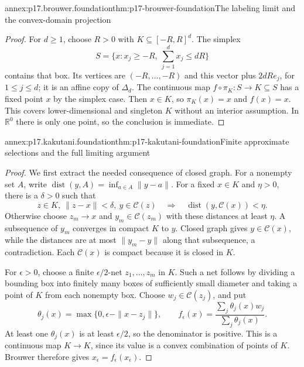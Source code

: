 \begin{annexitem}{annex:p17.brouwer.foundation}{thm:p17-brouwer-foundation}{The labeling limit and the convex-domain projection}
\begin{proof}
For \(d\geq1\), choose \(R>0\) with
\(K\subseteq[-R,R]^d\). The simplex
\[
          S=\{x:x_j\geq-R,\ \sum_{j=1}^d x_j\leq dR\}
\]
contains that box. Its vertices are
\((-R,\ldots,-R)\) and this vector plus
\(2dR e_j\), for \(1\leq j\leq d\);
it is an affine copy of \(\Delta_d\).
The continuous map \(f\circ\pi_K:S\to K\subseteq S\)
has a fixed point \(x\) by the simplex case.
Then \(x\in K\), so \(\pi_K(x)=x\) and
\(f(x)=x\). This covers lower-dimensional
and singleton \(K\) without an interior
assumption. In \(\mathbb R^0\) there is
only one point, so the conclusion is immediate.
\end{proof}
\end{annexitem}

\begin{annexitem}{annex:p17.kakutani.foundation}{thm:p17-kakutani-foundation}{Finite approximate selections and the full limiting argument}
\begin{proof}
We first extract the needed consequence of closed graph.
For a nonempty set \(A\), write
\(\operatorname{dist}(y,A)=\inf_{a\in A}\|y-a\|\).
For a fixed \(x\in K\) and \(\eta>0\), there is a
\(\delta>0\) such that
\[
 z\in K,\ \|z-x\|<\delta,\ y\in\mathcal C(z)
                    \quad\Longrightarrow\quad
                    \operatorname{dist}(y,\mathcal C(x))<\eta.
\]
Otherwise choose \(z_m\to x\) and
\(y_m\in\mathcal C(z_m)\) with these distances
at least \(\eta\). A subsequence of \(y_m\)
converges in compact \(K\) to \(y\).
Closed graph gives \(y\in\mathcal C(x)\),
while the distances are at most \(\|y_m-y\|\)
along that subsequence, a contradiction.
Each \(\mathcal C(x)\) is compact because
it is closed in \(K\).

For \(\epsilon>0\), choose a finite
\(\epsilon/2\)-net \(z_1,\ldots,z_m\) in \(K\).
Such a net follows by dividing a bounding
box into finitely many boxes of sufficiently
small diameter and taking a point of \(K\)
from each nonempty box. Choose
\(w_j\in\mathcal C(z_j)\), and put
\[
 \theta_j(x)=\max\{0,\epsilon-\|x-z_j\|\},\qquad
 f_\epsilon(x)=\frac{\sum_j\theta_j(x)w_j}
                         {\sum_j\theta_j(x)}.
\]
At least one \(\theta_j(x)\) is at least
\(\epsilon/2\), so the denominator is positive.
This is a continuous map \(K\to K\),
since its value is a convex combination
of points of \(K\). Brouwer therefore
gives \(x_\epsilon=f_\epsilon(x_\epsilon)\).


\end{proof}
\end{annexitem}
